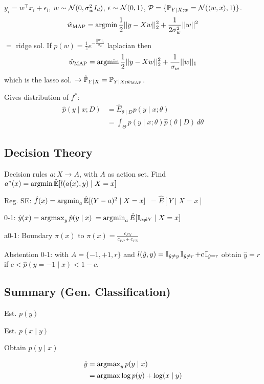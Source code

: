 \begin{definition}[Ex. Reg.]
  \(y_i = w^\top x_i + \epsilon_i\), \(w \sim \normal(0 , \sigma_w^2 I_d)\), \(\epsilon \sim \normal(0, 1)\), \(\mathcal{P} = \{\P_{Y \mid X; w} = \normal(\langle w, x\rangle, 1)\}\).
  \[\hat{w}_{\text{MAP}} = \argmin \frac{1}{2}||y- Xw||_2^2 + \frac{1}{2\sigma_w^2} ||w||^2\]
  \(=\) ridge sol. If \(p(w) = \frac{1}{z}e^{-\frac{||w||_1}{\sigma_w}}\) laplacian then
  \[\hat{w}_{\text{MAP}} = \argmin \frac{1}{2}||y- Xw||_2^2 + \frac{1}{\sigma_w} ||w||_1\]
  which is the lasso sol. \(\to \hat{\P}_{Y \mid X} = \P_{Y \mid X; \hat{w}_{\text{MAP}}}\).
\end{definition}

\begin{definition}
  Gives distribution of \(f^*\):
  \begin{align*}
    \hat{p}(y \mid x; D) &= \hat{E}_{\theta \mid D}p(y \mid x; \theta) \\
    &= \int_\Theta p(y \mid x; \theta) \hat{p}(\theta \mid D) \, d\theta
  \end{align*}
\end{definition}

\subsection{Decision Theory}
Decision rules \(a : X \to A\), with \(A\) as action set.
Find \(a^*(x) = \argmin \hat{\E}[l(a(x), y) \mid X = x]\)

\begin{definition}
  \begin{itemize*}
    \item Reg. SE: \(\hat{f}(x) = \argmin_a \hat{\E}[(Y - a)^2 \mid X=x]\) \(= \hat{E}[Y \mid X = x]\)
    \item 0-1: \(\hat{y}(x) = \argmax_y \hat{p}(y \mid x) \) \(= \argmin_a \hat{E}[\I_{a \neq Y} \mid X = x]\)
    \item a0-1: Boundary \(\pi(x)\) to \(\pi(x) = \frac{c_{FN}}{c_{FP} + c_{FN}}\)
    \item Abstention 0-1: with \(A = \{-1, +1, r\}\) and \(l(\hat{y}, y) = \I_{\hat{y} \neq y}\I_{\hat{y} \neq r} + c \I_{\hat{y} = r}\) obtain \(\hat{y} = r\) if \(c < \hat{p}(y = -1 \mid x) < 1 - c\).
  \end{itemize*}
\end{definition}

\subsection{Summary (Gen. Classification)}
\begin{enumerate*}
  \item Est. \(p(y)\)
  \item Est. \(p(x \mid y)\)
  \item Obtain \(p(y \mid x)\)
\end{enumerate*}
\begin{align*}
  \hat{y} &= \argmax_y p(y \mid x) \\ &= \argmax \log p(y) + \log(x \mid y)
\end{align*}